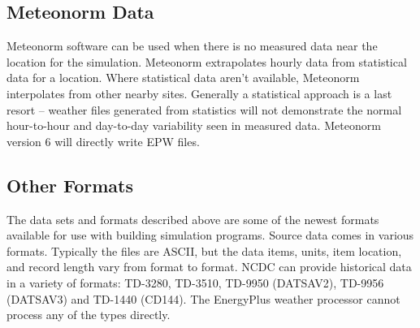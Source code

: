 \subsection{Meteonorm Data}\label{meteonorm-data}

Meteonorm software can be used when there is no measured data near the location for the simulation. Meteonorm extrapolates hourly data from statistical data for a location. Where statistical data aren't available, Meteonorm interpolates from other nearby sites. Generally a statistical approach is a last resort -- weather files generated from statistics will not demonstrate the normal hour-to-hour and day-to-day variability seen in measured data. Meteonorm version 6 will directly write EPW files.

\subsection{Other Formats}\label{other-formats}

The data sets and formats described above are some of the newest formats available for use with building simulation programs. Source data comes in various formats. Typically the files are ASCII, but the data items, units, item location, and record length vary from format to format. NCDC can provide historical data in a variety of formats: TD-3280, TD-3510, TD-9950 (DATSAV2), TD-9956 (DATSAV3) and TD-1440 (CD144). The EnergyPlus weather processor cannot process any of the types directly.

